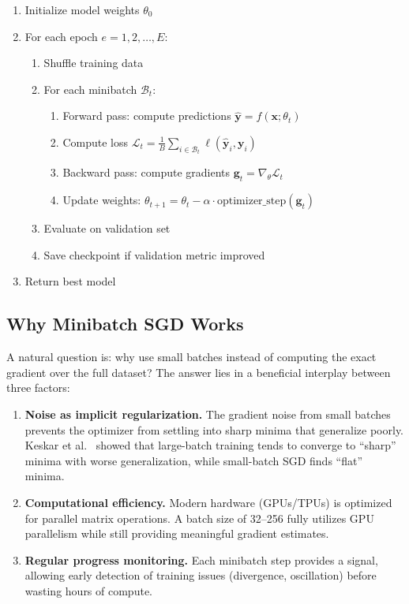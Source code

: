 \begin{algorithm}[H]
\caption{Training Loop}
\begin{enumerate}
    \item Initialize model weights $\theta_0$
    \item For each epoch $e = 1, 2, \ldots, E$:
    \begin{enumerate}
        \item Shuffle training data
        \item For each minibatch $\mathcal{B}_t$:
        \begin{enumerate}
            \item Forward pass: compute predictions $\hat{\mathbf{y}} = f(\mathbf{x}; \theta_t)$
            \item Compute loss $\mathcal{L}_t = \frac{1}{B}\sum_{i \in \mathcal{B}_t} \ell(\hat{\mathbf{y}}_i, \mathbf{y}_i)$
            \item Backward pass: compute gradients $\mathbf{g}_t = \nabla_\theta \mathcal{L}_t$
            \item Update weights: $\theta_{t+1} = \theta_t - \alpha \cdot \text{optimizer\_step}(\mathbf{g}_t)$
        \end{enumerate}
        \item Evaluate on validation set
        \item Save checkpoint if validation metric improved
    \end{enumerate}
    \item Return best model
\end{enumerate}
\end{algorithm}

\subsection{Why Minibatch SGD Works}

A natural question is: why use small batches instead of computing the exact gradient over the full dataset? The answer lies in a beneficial interplay between three factors:

\begin{enumerate}
    \item \textbf{Noise as implicit regularization.} The gradient noise from small batches prevents the optimizer from settling into sharp minima that generalize poorly. Keskar et al.\ \cite{keskar2017largebatch} showed that large-batch training tends to converge to ``sharp'' minima with worse generalization, while small-batch SGD finds ``flat'' minima.
    
    \item \textbf{Computational efficiency.} Modern hardware (GPUs/TPUs) is optimized for parallel matrix operations. A batch size of 32--256 fully utilizes GPU parallelism while still providing meaningful gradient estimates.
    
    \item \textbf{Regular progress monitoring.} Each minibatch step provides a signal, allowing early detection of training issues (divergence, oscillation) before wasting hours of compute.
\end{enumerate}

